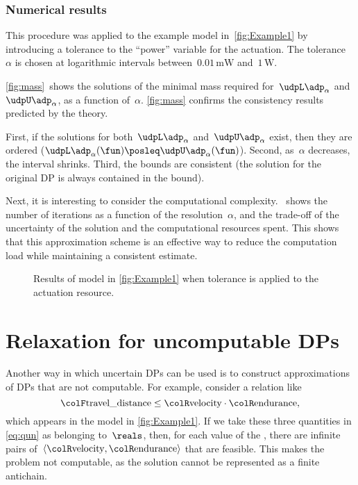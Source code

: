 \subsubsection{Numerical results}

This procedure was applied to the example model in~\cref{fig:Example1} by introducing a tolerance to the ``power'' variable for the actuation.
The tolerance~$\alpha$ is chosen at logarithmic intervals between~$0.01\,\text{mW}$ and~$1\,\text{W}$.

\cref{fig:mass}~shows the solutions of the minimal mass required for~$\udpL\adp_{\alpha}$ and~$\udpU\adp_{\alpha}$, as a function of~$\alpha$. \cref{fig:mass} confirms the consistency results predicted by the theory.

First, if the solutions for both~$\udpL\adp_{\alpha}$ and~$\udpU\adp_{\alpha}$ exist, then they are ordered ($\udpL\adp_{\alpha}(\fun)\posleq\udpU\adp_{\alpha}(\fun)$).
Second, as~$\alpha$ decreases, the interval shrinks.
Third, the bounds are consistent (the solution for the original DP is always contained in the bound).

Next, it is interesting to consider the computational complexity.
~shows the number of iterations as a function of the resolution~$\alpha$, and the trade-off of the uncertainty of the solution and the computational resources spent.
This shows that this approximation scheme is an effective way to reduce the computation load while maintaining a consistent estimate.

\vfill
\begin{figure}[h]
    \caption{
        Results of model in \cref{fig:Example1} when tolerance is applied to the actuation  resource.
    }
\end{figure}

\section[Uncomputable DPs]{Relaxation for uncomputable DPs}
\label{sec:Application-relax}

Another way in which uncertain DPs can be used is to construct approximations of DPs that are not computable.
For example, consider a relation like
%
\begin{equation}\label{eq:qun}
    {\colF\text{travel\_distance}}
    \leq{\colR\text{velocity}}\cdot{\colR\text{endurance}},
\end{equation}
%
which appears in the model in \cref{fig:Example1}.
If we take these three quantities in \cref{eq:qun} as belonging to~$\reals$, then, for each value of the , there are infinite pairs of~$\left\langle {\colR\text{velocity}},{\colR\text{endurance}}\right\rangle $ that are feasible.
This makes the problem not computable, as the solution cannot be represented as a finite antichain.

